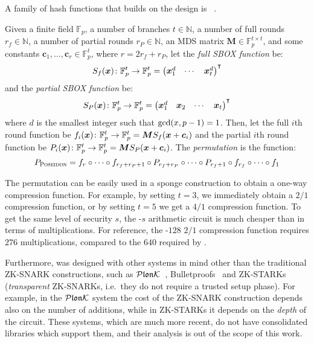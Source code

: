 A family of hash functions that builds on the \Hades{} design is \Poseidon~\cite{GrassiKRRS2021}.
\begin{definition}\label{def:poseidon}
  Given a finite field \(\mathbb{F}_p\), a number of branches \(t \in \mathbb{N}\), a number of 
  full rounds \(r_f \in \mathbb{N}\), a number of partial rounds \(r_{P} \in \mathbb{N}\), 
  an MDS matrix \(\bm{M} \in \mathbb{F}_{p}^{t \times t}\), and some constants 
  \(\bm{c}_{1}, \dots, \bm{c}_{r} \in \mathbb{F}_{p}^{t}\), where \(r = 2r_f + r_P\), let the 
  \emph{full SBOX function} be:
  \[
    \call{S_{f}}{\bm{x}}\colon \mathbb{F}_{p}^{t} \to \mathbb{F}_{p}^{t} = 
    {\begin{pmatrix}
      \bm{x}_{1}^{d} & \cdots & \bm{x}_{t}^{d}
    \end{pmatrix}}^{\transpose}
  \]
  and the \emph{partial SBOX function} be:
  \[
    \call{S_{P}}{\bm{x}}\colon \mathbb{F}_{p}^{t} \to \mathbb{F}_{p}^{t} = 
    {\begin{pmatrix}
      \bm{x}_{1}^{d} & \bm{x}_{2} & \cdots & \bm{x}_{t}
    \end{pmatrix}}^{\transpose}
  \]
  where \(d\) is the smallest integer such that \(\call{\gcd}{x, p - 1} = 1\).
  Then, let the full \(i\)th round function be 
  \(\call{f_{i}}{\bm{x}}\colon \mathbb{F}_{p}^{t} \to \mathbb{F}_{p}^{t} = 
  \bm{M}\call{S_{f}}{\bm{x} + \bm{c}_{i}}\)
  and the partial \(i\)th round function be
  \(\call{P_{i}}{\bm{x}}\colon \mathbb{F}_{p}^{t} \to \mathbb{F}_{p}^{t} = 
  \bm{M}\call{S_{P}}{\bm{x} + \bm{c}_{i}}\).
  The \emph{\Poseidon{} permutation} is the function:
  \[
    P_{\textnormal{\textsc{Poseidon}}} = 
    f_{r} \circ \cdots \circ f_{r_f + r_P + 1} \circ 
    P_{r_f + r_P} \circ \cdots \circ P_{r_f + 1} \circ 
    f_{r_f} \circ \cdots \circ f_{1}
  \]
\end{definition}

The \Poseidon{} permutation can be easily used in a sponge construction to obtain a
one-way compression function.
For example, by setting \(t = 3\), we immediately obtain a \(2/1\) compression function, 
or by setting \(t = 5\) we get a \(4/1\) compression function.
To get the same level of security \(s\), the \Poseidon-\(s\) arithmetic circuit is much cheaper 
than \Mimc{} in terms of multiplications. 
For reference, the \Poseidon-\(128\) \(2/1\) compression function requires \(276\) 
multiplications, compared to the \(640\) required by \Mimc{}.

Furthermore, \Poseidon{} was designed with other systems in mind other than the traditional 
ZK-SNARK constructions, such as \(\mathcal{P}\mathfrak{lon}\mathcal{K} \)~\cite{GabizonWC2019}, 
Bulletproofs~\cite{BunzBBPWM2017} and ZK-STARKs~\cite{SassonBHR2018} 
(\emph{transparent} ZK-SNARKs, i.e.\ they do not require a trusted setup phase).
For example, in the \(\mathcal{P}\mathfrak{lon}\mathcal{K} \) system the cost of the ZK-SNARK construction depends also 
on the number of additions, while in ZK-STARKs it depends on the \emph{depth} of the circuit.
These systems, which are much more recent, do not have consolidated libraries which support them, 
and their analysis is out of the scope of this work.

